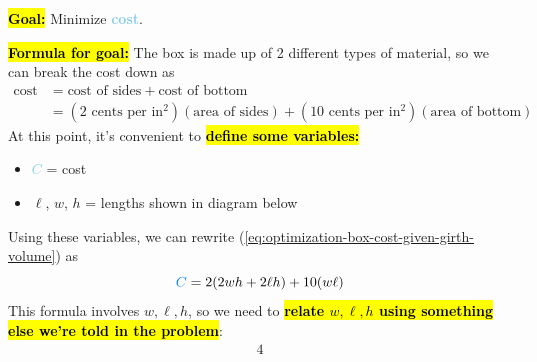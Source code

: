 \documentclass{article}
\newcommand{\highlight}[1]{\boldmath\hl{\textbf{#1}}\unboldmath}
\newcommand{\goal}[1]{\textbf{\textcolor{skyblue}{#1}}}
\theoremstyle{theorem}
\begin{document}
\begin{enumerate}
  \begin{solution}
    \highlight{Goal:} Minimize \goal{cost}.

    \highlight{Formula for goal:} The box is made up of 2 different types of material, so we can break the cost down as
    \begin{align}
      \text{cost} &= \text{cost of sides} + \text{cost of bottom} \nonumber \\
      &= (2 \text{ cents per in$^2$})(\text{area of sides}) + (10 \text{ cents per in$^2$})(\text{area of bottom}) \label{eq:optimization-box-cost-given-girth-volume}
    \end{align}
    At this point, it's convenient to \highlight{define some variables:}
    \begin{itemize}
    \item \goal{$C$} = cost
    \item $\ell$, $w$, $h$ = lengths shown in diagram below
    \end{itemize}
    \begin{center}
    \end{center}
    Using these variables, we can rewrite (\ref{eq:optimization-box-cost-given-girth-volume}) as
    \begin{equation} \label{eq:optimization-box-cost-given-girth-volume-2}
      \goal{$C$} = 2 (2 w h + 2 \ell h) + 10 (w \ell)
    \end{equation}
    This formula involves $w, \ell, h$, so we need to \highlight{relate $w, \ell, h$ using something else we're told in the problem}:
    \begin{alignat*}{4}

\end{alignat*}
\end{solution}
\end{enumerate}
\end{document}
